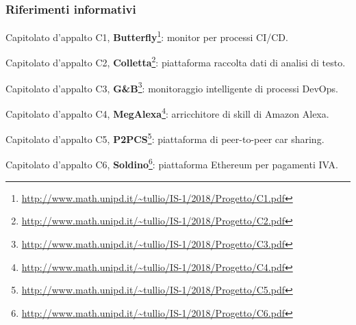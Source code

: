         \subsubsection{Riferimenti informativi}
            \begin{itemize}
                {\hypersetup{urlcolor=blue}
                \item Capitolato d'appalto C1, \textbf{Butterfly}\footnote{\url{http://www.math.unipd.it/~tullio/IS-1/2018/Progetto/C1.pdf}}:
                    monitor per processi CI/CD.
                \item Capitolato d'appalto C2, \textbf{Colletta}\footnote{\url{http://www.math.unipd.it/~tullio/IS-1/2018/Progetto/C2.pdf}}:
                    piattaforma raccolta dati di analisi di testo.
                \item Capitolato d'appalto C3, \textbf{G\&B}\footnote{\url{http://www.math.unipd.it/~tullio/IS-1/2018/Progetto/C3.pdf}}:
                    monitoraggio intelligente di processi DevOps.
                \item Capitolato d'appalto C4, \textbf{MegAlexa}\footnote{\url{http://www.math.unipd.it/~tullio/IS-1/2018/Progetto/C4.pdf}}:
                    arricchitore di skill di Amazon Alexa.
                \item Capitolato d'appalto C5, \textbf{P2PCS}\footnote{\url{http://www.math.unipd.it/~tullio/IS-1/2018/Progetto/C5.pdf}}:
                    piattaforma di peer-to-peer car sharing.
                \item Capitolato d'appalto C6, \textbf{Soldino}\footnote{\url{http://www.math.unipd.it/~tullio/IS-1/2018/Progetto/C6.pdf}}:
                    piattaforma Ethereum per pagamenti IVA.
                }
            \end{itemize}
